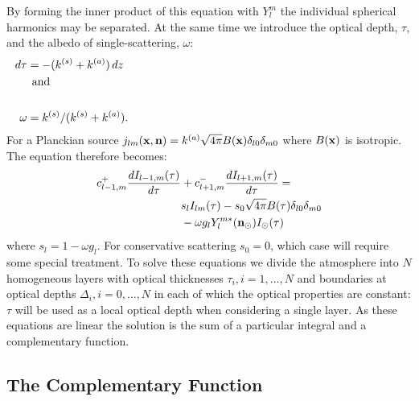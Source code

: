 By forming the inner product of this equation with $Y_l^m$ the individual
spherical harmonics may be separated. At the same time we introduce the
optical depth, $\tau$, and the albedo of single-scattering, $\omega$:
\begin{align}
d\tau &= -(k^{(s)} + k^{(a)}) \, dz \\
\noalign{and} \\
\omega &= k^{(s)}/(k^{(s)} + k^{(a)}).
\end{align}
For a Planckian source $j_{lm}(\mathbf{x},\mathbf{n})=k^{(a)} \sqrt{4\pi} B(\mathbf{x}) \delta_{l0}
\delta_{m0}$ 
where $B(\mathbf{x})$ is isotropic.
The equation therefore becomes:
\begin{equation}
\begin{split}
c_{l-1,m}^+ { {dI_{l-1,m}(\tau)} \over {d\tau} } &+
c_{l+1,m}^- { {dI_{l+1,m}(\tau)} \over {d\tau} } = \\
& s_l I_{lm}(\tau) -s_0 \sqrt{4\pi} B(\tau) \delta_{l0} \delta_{m0} \\
&-\omega g_l Y_l^{m*} (\mathbf{n}_\odot) I_\odot (\tau)
\end{split}
\end{equation}
where $s_l=1-\omega g_l$. For conservative scattering $s_0=0$, which case
will require some special treatment.
To solve these equations we divide the atmosphere
into $N$ homogeneous layers with optical thicknesses $\tau_i, i=1,\ldots, N$
and boundaries at optical depths $\Delta_i, i=0,\ldots, N$ 
in each of which the optical properties are
constant: $\tau$ will be used as a local optical depth when considering a 
single layer.
As these equations are linear the solution is the sum of a particular
integral and a complementary function.

\subsection{The Complementary Function}

